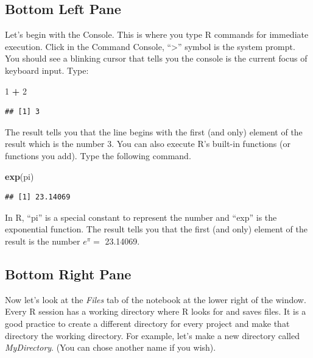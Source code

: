 \documentclass[
]{book}
\newenvironment{Shaded}{\begin{snugshade}}{\end{snugshade}}
\newcommand{\DecValTok}[1]{\textcolor[rgb]{0.00,0.00,0.81}{#1}}
\newcommand{\KeywordTok}[1]{\textcolor[rgb]{0.13,0.29,0.53}{\textbf{#1}}}
\newcommand{\NormalTok}[1]{#1}
\newcommand{\OperatorTok}[1]{\textcolor[rgb]{0.81,0.36,0.00}{\textbf{#1}}}
\newcommand{\StringTok}[1]{\textcolor[rgb]{0.31,0.60,0.02}{#1}}
\begin{document}
\hypertarget{bottom-left-pane}{%
\subsection*{Bottom Left Pane}\label{bottom-left-pane}}

Let's begin with the Console. This is where you type R commands for immediate execution. Click in the Command Console, ``\textgreater{}'' symbol is the system prompt. You should see a blinking cursor that tells you the console is the current focus of keyboard input. Type:

\begin{Shaded}
\begin{Highlighting}[]
\DecValTok{1} \OperatorTok{+}\StringTok{ }\DecValTok{2}
\end{Highlighting}
\end{Shaded}

\begin{verbatim}
## [1] 3
\end{verbatim}

The result tells you that the line begins with the first (and only) element of the result which is the number 3. You can also execute R's built-in functions (or functions you add). Type the following command.

\begin{Shaded}
\begin{Highlighting}[]
\KeywordTok{exp}\NormalTok{(pi)}
\end{Highlighting}
\end{Shaded}

\begin{verbatim}
## [1] 23.14069
\end{verbatim}

In R, ``pi'' is a special constant to represent the number and ``exp'' is the exponential function. The result tells you that the first (and only) element of the result is the number \(e^{\pi}=\) 23.14069.

\hypertarget{bottom-right-pane}{%
\subsection*{Bottom Right Pane}\label{bottom-right-pane}}

Now let's look at the \emph{Files} tab of the notebook at the lower right of the window. Every R session has a working directory where R looks for and saves files. It is a good practice to create a different directory for every project and make that directory the working directory. For example, let's make a new directory called \emph{MyDirectory}. (You can chose another name if you wish).
\end{document}
